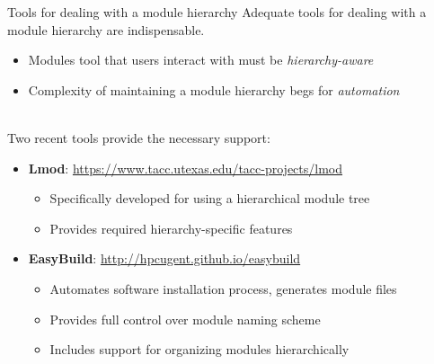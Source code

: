 \documentclass[10pt,xcolor={usenames,dvipsnames}]{beamer}
\begin{document}
\begin{frame}{Tools for dealing with a module hierarchy}
Adequate tools for dealing with a module hierarchy are indispensable.
\begin{itemize}
    \item
        Modules tool that users interact with must be \textit{hierarchy-aware}
    \item
        Complexity of maintaining a module hierarchy begs for \textit{automation}
\end{itemize}~\\

Two recent tools provide the necessary support:
\begin{itemize}    
    \item
        \textbf{Lmod}: \url{https://www.tacc.utexas.edu/tacc-projects/lmod}
        \begin{itemize}
            \item
                Specifically developed for using a hierarchical module tree
            \item
                Provides required hierarchy-specific features
        \end{itemize}
    \item
        \textbf{EasyBuild}: \url{http://hpcugent.github.io/easybuild}
        \begin{itemize}
            \item
                Automates software installation process, generates module files
            \item
                Provides full control over module naming scheme
            \item
                Includes support for organizing modules hierarchically
        \end{itemize}
\end{itemize}
\end{frame}

\end{document}

